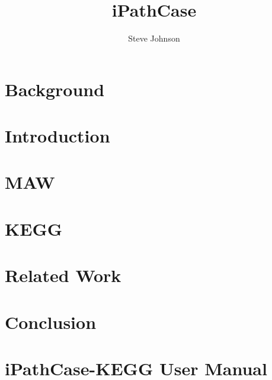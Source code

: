 \documentclass[12pt]{report}
\title{iPathCase}
\author{Steve Johnson}
\begin{document}

\newcommand{\mawapp}{ iPathCase-MAW }
\newcommand{\mawappp}{ iPathCase-MAW's }
\newcommand{\keggapp}{ iPathCase-KEGG }
\newcommand{\keggappp}{ iPathCase-KEGG's }



\setcounter{page}{1}


\setcounter{tocdepth}{1}
\tableofcontents

{}
\listoftables

{}
\listoffigures

\doublespace

\pagebreak

\setcounter{page}{1}


\pagebreak

\chapter{Background}
\label{ch:background}


\chapter{Introduction}
\label{ch:introduction}


\chapter{MAW}
\label{ch:maw_smda}


\chapter{KEGG}
\label{ch:kegg}


\chapter{Related Work}
\label{ch:related_work}


\chapter{Conclusion}
\label{ch:conclusion}


\appendix

\chapter{\keggapp User Manual}
\label{ch:kegg_manual}





\end{document}
